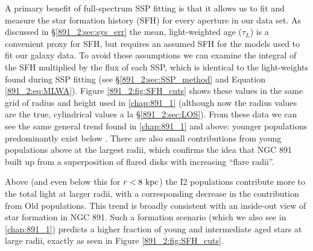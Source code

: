 A primary benefit of full-spectrum SSP fitting is that it allows us to
fit and measure the star formation history (SFH) for every aperture in
our data set. As discussed in \S\ref{891_2:sec:sys_err} the mean,
light-weighted age ($\tau_L$) is a convenient proxy for SFH, but
requires an assumed SFH for the models used to fit our galaxy data. To
avoid these assumptions we can examine the integral of the SFH
multiplied by the flux of each SSP, which is identical to the
light-weights found during SSP fitting (see
\S\ref{891_2:sec:SSP_method} and Equation \ref{891_2:eq:MLWA}). Figure
\ref{891_2:fig:SFH_cuts} shows these values in the same grid of radius
and height used in \ref{chap:891_1} (although now the radius values
are the true, cylindrical values a la \S\ref{891_2:sec:LOS}). From
these data we can see the same general trend found in \ref{chap:891_1}
and above: younger populations predominantly exist below
. There are also small contributions from young
populations above  at the largest radii, which confirms
the idea that NGC 891 built up from a superposition of flared disks
with increasing ``flare radii''.

Above  (and even below this for $r < 8~\mathrm{kpc} $) the
I2 populations contribute more to the total light at larger radii,
with a corresponding decrease in the contribution from Old
populations. This trend is broadly consistent with an inside-out view
of star formation in NGC 891. Such a formation scenario (which we also
see in \ref{chap:891_1}) predicts a higher fraction of young and
intermediate aged stars at large radii, exactly as seen in Figure
\ref{891_2:fig:SFH_cuts}.



